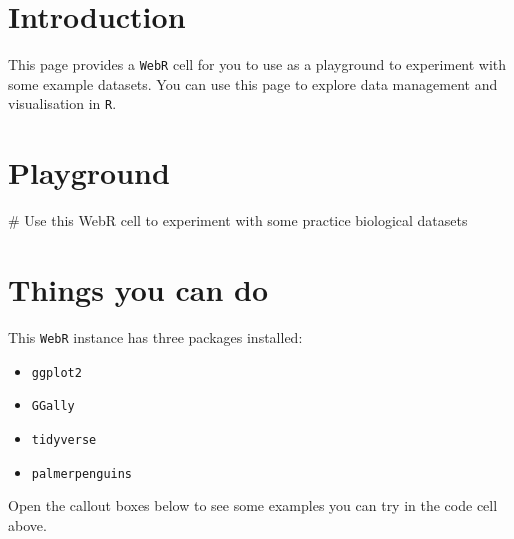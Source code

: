 \documentclass[
  letterpaper,
  DIV=11,
  numbers=noendperiod]{scrreprt}
\newenvironment{Shaded}{\begin{snugshade}}{\end{snugshade}}
\newcommand{\NormalTok}[1]{\textcolor[rgb]{0.00,0.23,0.31}{#1}}
\providecommand{\tightlist}{%
  \setlength{\itemsep}{0pt}\setlength{\parskip}{0pt}}\usepackage{longtable,booktabs,array}
\begin{document}
\section{Introduction}\label{introduction-1}

This page provides a \texttt{WebR} cell for you to use as a playground
to experiment with some example datasets. You can use this page to
explore data management and visualisation in \texttt{R}.

\section{Playground}\label{playground}

\begin{Shaded}
\begin{Highlighting}[]
\NormalTok{\# Use this WebR cell to experiment with some practice biological datasets}
\end{Highlighting}
\end{Shaded}

\section{Things you can do}\label{things-you-can-do}

This \texttt{WebR} instance has three packages installed:

\begin{itemize}
\tightlist
\item
  \texttt{ggplot2}
\item
  \texttt{GGally}
\item
  \texttt{tidyverse}
\item
  \texttt{palmerpenguins}
\end{itemize}

Open the callout boxes below to see some examples you can try in the
code cell above.
\end{document}
